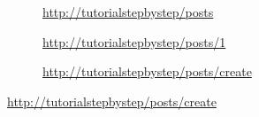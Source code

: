 \begin{figure}[!h]
    \begin{subfigure}[c]{0.73\textwidth}
    \end{subfigure}\hfill
    \begin{subfigure}[c]{0.24\textwidth}
        \caption{\url{http://tutorialstepbystep/posts}} 
    \end{subfigure}
    \begin{subfigure}[c]{0.73\textwidth}
    \end{subfigure}\hfill
    \begin{subfigure}[c]{0.24\textwidth}
        \caption{\url{http://tutorialstepbystep/posts/1}} 
    \end{subfigure}
    \begin{subfigure}[c]{0.73\textwidth}
    \end{subfigure}\hfill
    \begin{subfigure}[c]{0.24\textwidth}
        \caption{\url{http://tutorialstepbystep/posts/create}} 

\end{subfigure}
\end{figure}
